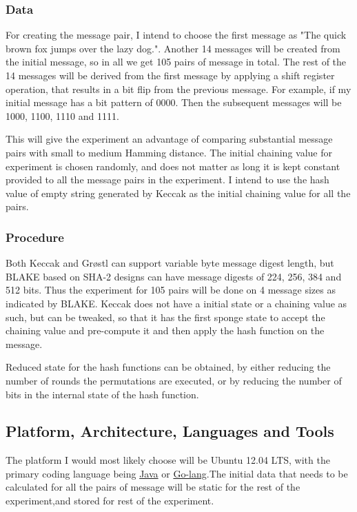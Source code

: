 \documentclass[12pt]{artikel3}                  %
\begin{document}
  \subsubsection{Data}
  
  For creating the message pair, I intend to choose the first message as "The quick brown fox jumps over the lazy dog.".
  Another 14 messages will be created from the initial message, so in all we get %
  105 pairs of message in total. The rest of the 14 messages will be derived from the first message by applying a
  shift register operation, that results in a bit flip from the previous message. For example, if my initial message has
  a bit pattern of 0000. Then the subsequent messages will be 1000, 1100, 1110 and 1111.
  
  This will give the experiment an advantage of comparing substantial message pairs with small to medium Hamming distance.
  The initial chaining value for experiment is chosen randomly, and does not matter as long it is kept constant provided
  to all the message pairs in the experiment. I intend to use the hash value of empty string generated by Keccak as the 
  initial chaining value for all the pairs.

  \subsubsection{Procedure}

  Both Keccak and Gr{\o}stl can support variable byte message digest length, but BLAKE based on SHA-2 designs can have
  message digests of 224, 256, 384 and 512 bits. Thus the experiment for 105 pairs will be done on 4 message sizes as
  indicated by BLAKE. Keccak does not have a initial state or a chaining value as such, but can be tweaked, so that it
  has the first sponge state to accept the chaining value and pre-compute it and then apply the hash function on the
  message.

  Reduced state for the hash functions can be obtained, by either reducing the number of rounds the permutations
  are executed, or by reducing the number of bits in the internal state of the hash function.

\subsection{Platform, Architecture, Languages and Tools}
The platform I would most likely choose will be Ubuntu 12.04 LTS, with the primary coding language
being \href{"https://en.wikipedia.org/wiki/Java\_(programming_language)"}{Java} or 
\href{"http://golang.org/"}{Go-lang}.The initial data that needs to be calculated for all the pairs 
of message will be static for the rest of the experiment,and stored for rest of the experiment.
\end{document}
